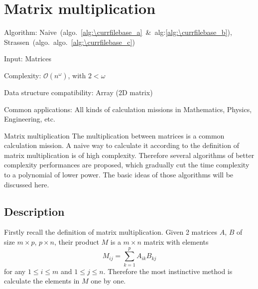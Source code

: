 \documentclass[catalog.tex]{subfiles}
\begin{document}
\def\pbname{Matrix multiplication} %

\section{\pbname} 

\begin{overview}
\item [Algorithm:] Naive~(algo.~\ref{alg:\currfilebase_a}~\&~alg:\ref{alg:\currfilebase_b}), Strassen~(algo.~algo.~\ref{alg:\currfilebase_c})
\item [Input:] Matrices
\item [Complexity:] $\mathcal{O}(n^\omega)$, with $2<\omega$
\item [Data structure compatibility:] Array (2D matrix)
\item [Common applications:] All kinds of calculation missions in Mathematics, Physics, Engineering, etc.
\end{overview}


\begin{problem}{\pbname}
	The multiplication between matrices is a common calculation mission. A naive way to calculate it according to the definition of matrix multiplication is of high complexity. Therefore several algorithms of better complexity performances are proposed, which gradually cut the time complexity to a polynomial of lower power. The basic ideas of those algorithms will be discussed here.
\end{problem}


\subsection*{Description}

Firstly recall the definition of matrix multiplication. Given 2 matrices $A$, $B$ of size $m\times p$, $p\times n$, their product $M$ is a $m\times n$ matrix with elements
$$
M_{ij} = \sum_{k=1}^p A_{ik}B_{kj}
$$
for any $1\leq i\leq m$ and $1\leq j \leq n$. Therefore the most instinctive method is calculate the elements in $M$ one by one.
\end{document}
